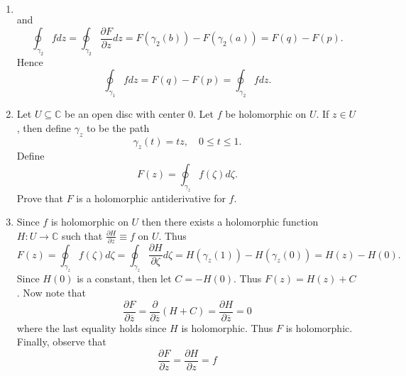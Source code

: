 \documentclass[12pt]{article}
\makeatletter
\theoremstyle{definition}
\theoremstyle{remark}
\renewenvironment{proof}[1][\proofname]{\par
  \pushQED{\qed}%
  \normalfont \topsep6\p@\@plus6\p@\relax
  \list{}{\leftmargin=0mm
          \rightmargin=4mm
          \settowidth{\itemindent}{\itshape#1}%
          \labelwidth=\itemindent
          \parsep=0pt \listparindent=\parindent 
  }
  \item[\hskip\labelsep
        \itshape
    #1\@addpunct{.}]\ignorespaces
}{%
  \popQED\endlist\@endpefalse
}
\let\oldproofname=\proofname
\renewcommand{\proofname}{\bf{\textit{\oldproofname}}}
\makeatother
\begin{document}
\begin{enumerate}[leftmargin=*]
\begin{proof}
\begin{equation*}
                    \end{equation*}
                and 
                    \begin{equation*}
                        \oint_{\gamma_2}fdz=\oint_{\gamma_2}\frac{\partial F}{\partial z}dz =F(\gamma_2(b))-F(\gamma_2(a))=F(q)-F(p).
                    \end{equation*}
                Hence
                    \begin{equation*}
                        \oint_{\gamma_1}fdz=F(q)-F(p)=\oint_{\gamma_2}fdz.
                    \end{equation*}
            \end{proof}
        \item Let $U\subseteq\mathbb{C}$ be an open disc with center 0. Let $f$ be holomorphic on $U$. If $z\in U$, then define $\gamma_z$ to be the path 
            \begin{equation*}
                \gamma_z(t)=tz,\quad 0\leq t\leq 1.
            \end{equation*}
        Define 
        \begin{equation*}
            F(z)=\oint_{\gamma_z}f(\zeta)d\zeta.
        \end{equation*}
        Prove that $F$ is a holomorphic antiderivative for $f$.
            \begin{proof}
                Since $f$ is holomorphic on $U$ then there exists a holomorphic function $H\colon U\rightarrow\mathbb{C}$ such that $\frac{\partial H}{\partial z}\equiv f$ on $U$. Thus 
                    \begin{equation*}
                        F(z)=\oint_{\gamma_z}f(\zeta)d\zeta=\oint_{\gamma_z}\frac{\partial H}{\partial\zeta}d\zeta=H(\gamma_z(1))-H(\gamma_z(0))=H(z)-H(0).
                    \end{equation*}
                Since $H(0)$ is a constant, then let $C=-H(0)$. Thus $F(z)=H(z)+C$. Now note that 
                    \begin{equation*}
                        \frac{\partial F}{\partial\overline{z}}=\frac{\partial}{\partial\overline{z}}(H+C)=\frac{\partial H}{\partial\overline{z}}=0
                    \end{equation*}
                where the last equality holds since $H$ is holomorphic. Thus $F$ is holomorphic. Finally, observe that
                    \begin{equation*}
                        \frac{\partial F}{\partial z}=\frac{\partial H}{\partial z}=f
                    \end{equation*}    

\end{proof}
\end{enumerate}
\end{document}
